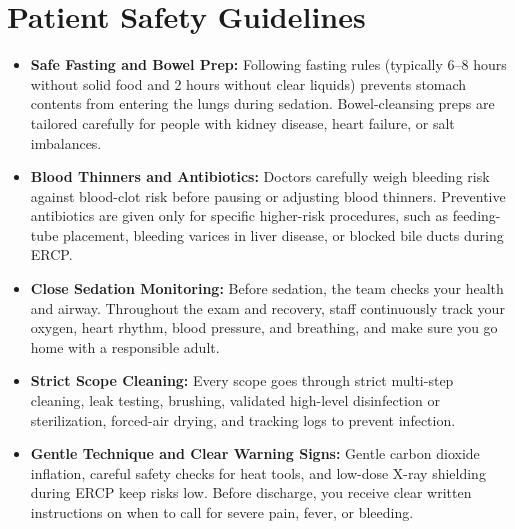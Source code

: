 \section{Patient Safety Guidelines}
\begin{itemize}
\item \textbf{Safe Fasting and Bowel Prep:} Following fasting rules (typically 6--8 hours without solid food and 2 hours without clear liquids) prevents stomach contents from entering the lungs during sedation. Bowel-cleansing preps are tailored carefully for people with kidney disease, heart failure, or salt imbalances.
\item \textbf{Blood Thinners and Antibiotics:} Doctors carefully weigh bleeding risk against blood-clot risk before pausing or adjusting blood thinners. Preventive antibiotics are given only for specific higher-risk procedures, such as feeding-tube placement, bleeding varices in liver disease, or blocked bile ducts during ERCP.
\item \textbf{Close Sedation Monitoring:} Before sedation, the team checks your health and airway. Throughout the exam and recovery, staff continuously track your oxygen, heart rhythm, blood pressure, and breathing, and make sure you go home with a responsible adult.
\item \textbf{Strict Scope Cleaning:} Every scope goes through strict multi-step cleaning, leak testing, brushing, validated high-level disinfection or sterilization, forced-air drying, and tracking logs to prevent infection.
\item \textbf{Gentle Technique and Clear Warning Signs:} Gentle carbon dioxide inflation, careful safety checks for heat tools, and low-dose X-ray shielding during ERCP keep risks low. Before discharge, you receive clear written instructions on when to call for severe pain, fever, or bleeding.
\end{itemize}


